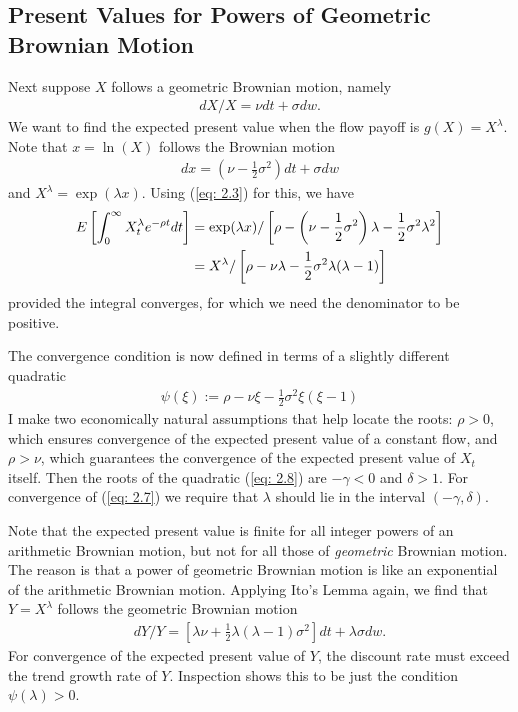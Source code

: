 \documentclass[\topdir/lecture\_notes.tex]{subfiles}
\begin{document}
\subsection{Present Values for Powers of Geometric Brownian Motion}
Next suppose $X$ follows a geometric Brownian motion, namely
\begin{align*}
dX / X=\nu dt+\sigma dw.
\end{align*}
We want to find the expected present value when the flow payoff is $g(X)=X^{\lambda}$. Note that $x=\ln (X)$ follows the Brownian motion
\begin{align*}
dx=\left(\nu-\frac{1}{2} \sigma^{2}\right) dt+\sigma dw
\end{align*}
and $X^{\lambda}=\exp (\lambda x)$. Using (\ref{eq: 2.3}) for this, we have
\begin{align}
E\left[\int_{0}^{\infty} X_{t}^{\lambda} e^{-\rho t} dt\right] & =\exp (\lambda x) /\left[\rho-\left(\nu-\frac{1}{2} \sigma^{2}\right) \lambda-\frac{1}{2} \sigma^{2} \lambda^{2}\right] \notag \\
& =X^{\lambda} /\left[\rho-\nu \lambda-\frac{1}{2} \sigma^{2} \lambda(\lambda-1)\right]
\label{eq: 2.7}
\end{align}
provided the integral converges, for which we need the denominator to be positive.

The convergence condition is now defined in terms of a slightly different quadratic
\begin{align}
\psi(\xi) := \rho-\nu \xi-\frac{1}{2} \sigma^{2} \xi(\xi-1) \label{eq: 2.8}
\end{align}
I make two economically natural assumptions that help locate the roots: $\rho>0$, which ensures convergence of the expected present value of a constant flow, and $\rho>\nu$, which guarantees the convergence
of the expected present value of $X_{t}$ itself. Then the roots of the quadratic (\ref{eq: 2.8}) are $-\gamma<0$ and $\delta>1$. For convergence of (\ref{eq: 2.7}) we require that $\lambda$ should lie in the interval $(-\gamma, \delta)$.

Note that the expected present value is finite for all integer powers of an arithmetic Brownian motion, but not for all those of \textit{geometric} Brownian motion. The reason is that a power of geometric Brownian motion is like an exponential of the arithmetic Brownian motion. Applying Ito's Lemma again, we find that $Y=X^{\lambda}$ follows the geometric Brownian motion
\begin{align*}
d Y / Y=\left[\lambda \nu+\frac{1}{2} \lambda(\lambda-1) \sigma^{2}\right] dt+\lambda \sigma dw.
\end{align*}
For convergence of the expected present value of $Y$, the discount rate must exceed the trend growth rate of $Y$. Inspection shows this to be just the condition $\psi(\lambda)>0$.
\end{document}
